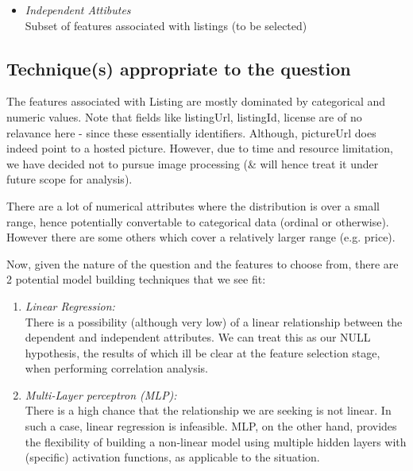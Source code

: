 \documentclass[conference]{IEEEtran}
\begin{document}
{\begin{itemize}
				$  SuccessRate(listingId)  =  \frac{| ReservedCalendar(listingId) |} {| ListingCalendar(listingId) | } $ \\ 
				
				Success Rate is not directly available as a field in the database. Hence, we trigger an SQL query to compute this field and associate it with the corresponding Listing features vis Jupyter Notebook. (The query and resulting CSV can be found in  \textit{'backend\_travelgenius{\textbackslash}\_\_datamining\_{\textbackslash}DataMining.ipynb' \cite{4_Backend}})

		\vspace{1mm}

		\item \textit{Independent Attibutes}\\
			Subset of features associated with listings (to be selected)
	\end{itemize}
        
   \subsection{\textbf{Technique(s) appropriate to the question}}
	The features associated with Listing are mostly dominated by categorical and numeric values. Note that fields like listingUrl, listingId, license are of no relavance here - since these essentially identifiers. Although, pictureUrl does indeed point to a hosted picture. However, due to time and resource limitation, we have decided not to pursue image processing  (\& will hence treat it under future scope for analysis).
	
	There are a lot of numerical attributes where the distribution is over a small range, hence potentially convertable to categorical data (ordinal or otherwise). However there are some others which cover a relatively larger range (e.g. price).

	\vspace{1mm}

	Now, given the nature of the question and the features to choose from, there are 2 potential model building techniques that we see fit:
	\begin{enumerate}
           	 \item \textit{Linear Regression: }\\ There is a possibility (although very low) of a linear relationship between the dependent and independent attributes. We can treat this as our NULL hypothesis, the results of which ill be clear at the feature selection stage, when performing correlation analysis.
		\vspace{1mm}
		\item \textit{Multi-Layer perceptron (MLP): }\\ There is a high chance that the relationship we are seeking is not linear. In such a case, linear regression is infeasible. MLP, on the other hand, provides the flexibility of building a non-linear model using multiple hidden layers with (specific) activation functions, as applicable to the situation.
	\end{enumerate}

}
\end{document}
